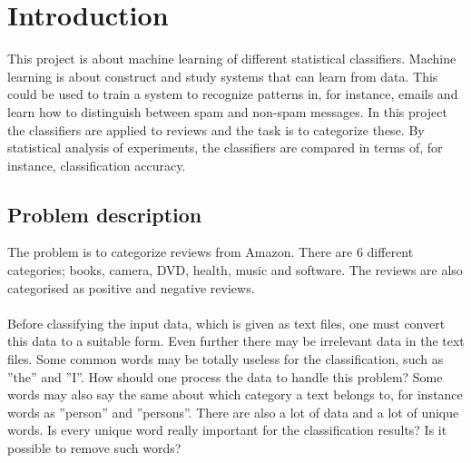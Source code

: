 \chapter{Introduction}
This project is about machine learning of different statistical classifiers.
Machine learning is about construct and study systems that can learn from data.
This could be used to train a system to recognize patterns in, for instance, emails and learn how to distinguish between spam and non-spam messages. In this project the classifiers are applied to reviews and the task is to categorize these.
By statistical analysis of experiments, the classifiers are compared in terms of, for instance, classification accuracy.

\section{Problem description}
The problem is to categorize reviews from Amazon. There are 6 different categories;
books, camera, DVD, health, music and software. The reviews are also
categorised as positive and negative reviews.
\\\\
Before classifying the input data, which is given as text files, one must
convert this data to a suitable form. Even further there may be irrelevant data
in the text files. Some common words may be totally useless for the classification,
such as ''the'' and ''I''. How should one process the data to handle this
problem? Some words may also say the same about which category a text belongs to, for instance
words as ''person'' and ''persons''. There are also a lot of data and  a lot of
unique words. Is every unique word really important for the classification
results? Is it possible to remove such words?


